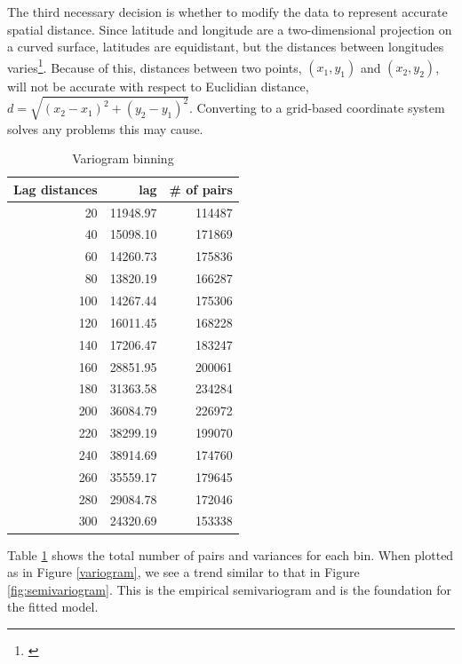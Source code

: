 \documentclass[12pt,twoside]{reedthesis}
\begin{document}
The third necessary decision is whether to modify the data to represent accurate spatial distance. Since latitude and longitude are a two-dimensional projection on a curved surface, latitudes are equidistant, but the distances between longitudes varies\footnote{\cite{SpatialEpi}}. Because of this, distances between two points, $(x_1, y_1)$ and $(x_2, y_2)$, will not be accurate with respect to Euclidian distance, $d = \sqrt{(x_2 - x_1)^2 + (y_2 - y_1)^2}$. Converting to a grid-based coordinate system solves any problems this may cause. 


\begin{table}[h!]

\centering

\begin{tabular}{r|r|r}
\hline
Lag distances & lag & \# of pairs\\
\hline
20 & 11948.97 & 114487\\
\hline
40 & 15098.10 & 171869\\
\hline
60 & 14260.73 & 175836\\
\hline
80 & 13820.19 & 166287\\
\hline
100 & 14267.44 & 175306\\
\hline
120 & 16011.45 & 168228\\
\hline
140 & 17206.47 & 183247\\
\hline
160 & 28851.95 & 200061\\
\hline
180 & 31363.58 & 234284\\
\hline
200 & 36084.79 & 226972\\
\hline
220 & 38299.19 & 199070\\
\hline
240 & 38914.69 & 174760\\
\hline
260 & 35559.17 & 179645\\
\hline
280 & 29084.78 & 172046\\
\hline
300 & 24320.69 & 153338\\
\hline
\end{tabular}

\caption{Variogram binning}
\label{bins}

\end{table}

Table \ref{bins} shows the total number of pairs and variances for each bin. When plotted as in Figure \ref{variogram}, we see a trend similar to that in Figure \ref{fig:semivariogram}. This is the empirical semivariogram and is the foundation for the fitted model.
	
\end{document}
